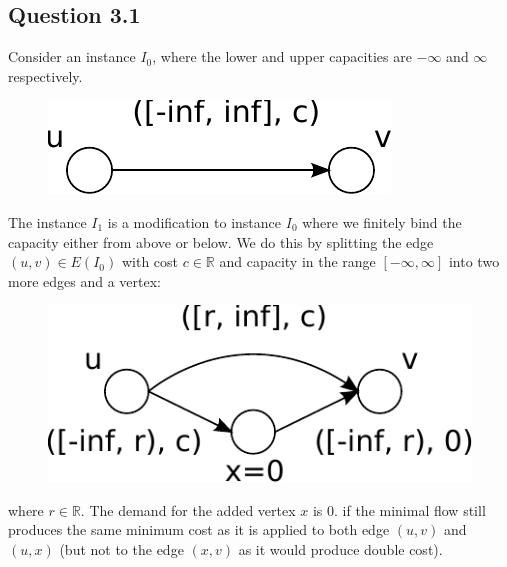 \documentclass[a4paper]{article}
\begin{document}
\subsection*{Question 3.1}
Consider an instance $I_0$, where the lower and upper capacities are $-\infty$ and $\infty$ respectively.
\begin{figure}[H]
\centering
\includegraphics[width=\textwidth / 2]{graphics/fig3.pdf}
\label{fig:ex30fig}
\end{figure}
The instance \(I_1\) is a modification to instance \(I_0\) where we finitely bind the capacity either from above or below.
We do this by splitting the edge \((u,v) \in E(I_0)\) with cost \(c \in \mathbb{R}\) and capacity in the range $[-\infty ,\infty]$ into two more edges and a vertex:
\begin{figure}[H]
\centering
\includegraphics[width=\textwidth / 2]{graphics/fig4.pdf}
\label{fig:ex31fig}
\end{figure}
where $r\in \mathbb{R}$. The demand for the added vertex $x$ is $0$. 
if the minimal flow still produces the same minimum cost as it is applied to both edge $(u,v)$ and $(u,x)$ (but not to the edge $(x,v)$ as it would produce double cost).
\end{document}
